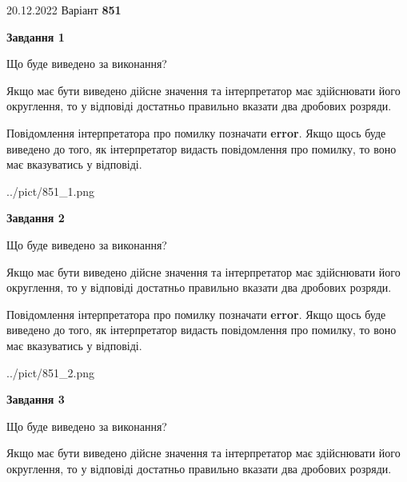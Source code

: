 \documentclass[12pt, ukrainian]{article}
\begin{document}
{20.12.2022 Варіант \No \textbf { 851 }\par}
{
\begin {Large}

{\begin {center}\textbf{Завдання 1}\end {center}}\par
Що буде виведено за виконання? \par

Якщо має бути виведено дійсне значення та інтерпретатор має здійснювати його округлення, 
то у відповіді достатньо правильно вказати два дробових розряди.

Повідомлення інтерпретатора про помилку позначати \textbf{error}.
Якщо щось буде виведено до того, як інтерпретатор видасть повідомлення про помилку, 
то воно має вказуватись у відповіді. \par

\begin{center}
	{../pict/851_1.png}
\end{center}
\newpage

{\begin {center}\textbf{Завдання 2}\end {center}}\par
Що буде виведено за виконання? \par

Якщо має бути виведено дійсне значення та інтерпретатор має здійснювати його округлення, 
то у відповіді достатньо правильно вказати два дробових розряди.

Повідомлення інтерпретатора про помилку позначати \textbf{error}.
Якщо щось буде виведено до того, як інтерпретатор видасть повідомлення про помилку, 
то воно має вказуватись у відповіді. \par

\begin{center}
	{../pict/851_2.png}
\end{center}
\newpage

{\begin {center}\textbf{Завдання 3}\end {center}}\par
Що буде виведено за виконання? \par

Якщо має бути виведено дійсне значення та інтерпретатор має здійснювати його округлення, 
то у відповіді достатньо правильно вказати два дробових розряди.


\end{Large}}
\end{document}
